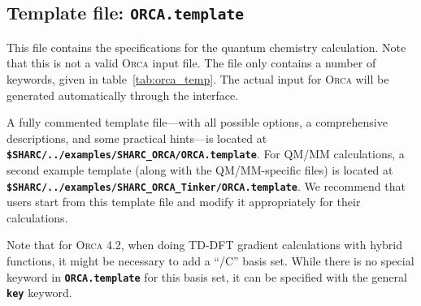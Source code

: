 \documentclass[a4paper,10pt,DIV=15,openany]{scrbook}
\newcommand{\ttt}[1]{\textbf{\texttt{#1}}}
\begin{document}
\subsection{Template file: \ttt{ORCA.template}}

This file contains the specifications for the quantum chemistry calculation. Note that this is not a valid \textsc{Orca} input file. The file only contains a number of keywords, given in table~\ref{tab:orca_temp}. The actual input for \textsc{Orca} will be generated automatically through the interface.

A fully commented template file---with all possible options, a comprehensive descriptions, and some practical hints---is located at \ttt{\$SHARC/../examples/SHARC\_ORCA/ORCA.template}.
For QM/MM calculations, a second example template (along with the QM/MM-specific files) is located at \ttt{\$SHARC/../examples/SHARC\_ORCA\_Tinker/ORCA.template}.
We recommend that users start from this template file and modify it appropriately for their calculations.

Note that for \textsc{Orca} 4.2, when doing TD-DFT gradient calculations with hybrid functions, it might be necessary to add a ``/C'' basis set.
While there is no special keyword in \ttt{ORCA.template} for this basis set, it can be specified with the general \ttt{key} keyword.
\end{document}

